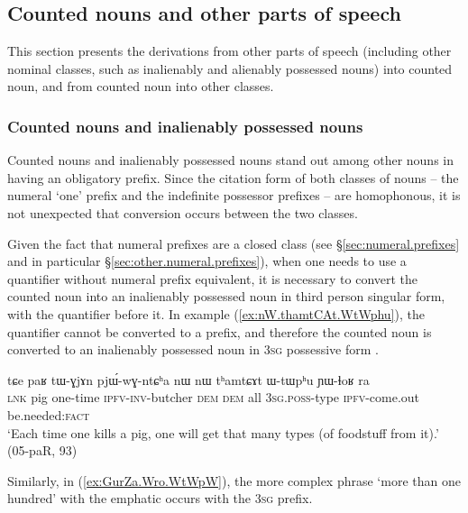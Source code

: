\subsection{Counted nouns and other parts of speech} \label{sec:CN.parts.of.speech}

This section presents the derivations from other parts of speech (including other nominal classes, such as inalienably and alienably possessed nouns) into counted noun, and from counted noun into other classes.

\subsubsection{Counted nouns and inalienably possessed nouns}   \label{sec:CN.IPN}
Counted nouns and inalienably possessed nouns stand out among other nouns in having an obligatory prefix. Since the citation form of both classes of nouns -- the numeral `one' prefix  and the indefinite possessor prefixes  -- are homophonous, it is not unexpected that conversion occurs between the two classes. 

Given the fact that numeral prefixes are a closed class (see §\ref{sec:numeral.prefixes} and in particular §\ref{sec:other.numeral.prefixes}), when one needs to use a quantifier without numeral prefix equivalent, it is necessary to convert the counted noun into an inalienably possessed noun in third person singular form, with the quantifier before it. In example (\ref{ex:nW.thamtCAt.WtWphu}), the quantifier  cannot be converted to a prefix, and therefore the counted noun  is converted to an inalienably possessed noun in \textsc{3sg} possessive form .

\begin{exe}
\ex \label{ex:nW.thamtCAt.WtWphu}
\gll tɕe paʁ tɯ-ɣjɤn pjɯ́-wɣ-ntɕʰa nɯ nɯ tʰamtɕɤt ɯ-tɯpʰu ɲɯ-ɬoʁ ra \\ 
 \textsc{lnk} pig one-time \textsc{ipfv}-\textsc{inv}-butcher \textsc{dem} \textsc{dem} all \textsc{3sg}.\textsc{poss}-type \textsc{ipfv}-come.out be.needed:\textsc{fact} \\
\glt `Each time one kills a pig, one will get that many types (of foodstuff from it).' (05-paR, 93)
\end{exe}

Similarly, in (\ref{ex:GurZa.Wro.WtWpW}), the more complex phrase  `more than one hundred' with the emphatic  occurs with the \textsc{3sg} prefix.

